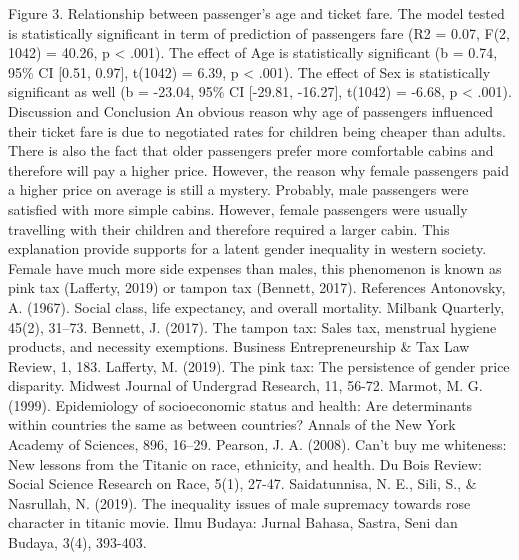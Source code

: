 \documentclass[
]{article}
\begin{document}
Figure 3. Relationship between passenger's age and ticket fare. The
model tested is statistically significant in term of prediction of
passengers fare (R2 = 0.07, F(2, 1042) = 40.26, p \textless{} .001). The
effect of Age is statistically significant (b = 0.74, 95\% CI {[}0.51,
0.97{]}, t(1042) = 6.39, p \textless{} .001). The effect of Sex is
statistically significant as well (b = -23.04, 95\% CI {[}-29.81,
-16.27{]}, t(1042) = -6.68, p \textless{} .001). Discussion and
Conclusion An obvious reason why age of passengers influenced their
ticket fare is due to negotiated rates for children being cheaper than
adults. There is also the fact that older passengers prefer more
comfortable cabins and therefore will pay a higher price. However, the
reason why female passengers paid a higher price on average is still a
mystery. Probably, male passengers were satisfied with more simple
cabins. However, female passengers were usually travelling with their
children and therefore required a larger cabin. This explanation provide
supports for a latent gender inequality in western society. Female have
much more side expenses than males, this phenomenon is known as pink tax
(Lafferty, 2019) or tampon tax (Bennett, 2017). References Antonovsky,
A. (1967). Social class, life expectancy, and overall mortality. Milbank
Quarterly, 45(2), 31--73. Bennett, J. (2017). The tampon tax: Sales tax,
menstrual hygiene products, and necessity exemptions. Business
Entrepreneurship \& Tax Law Review, 1, 183. Lafferty, M. (2019). The
pink tax: The persistence of gender price disparity. Midwest Journal of
Undergrad Research, 11, 56-72. Marmot, M. G. (1999). Epidemiology of
socioeconomic status and health: Are determinants within countries the
same as between countries? Annals of the New York Academy of Sciences,
896, 16--29. Pearson, J. A. (2008). Can't buy me whiteness: New lessons
from the Titanic on race, ethnicity, and health. Du Bois Review: Social
Science Research on Race, 5(1), 27-47. Saidatunnisa, N. E., Sili, S., \&
Nasrullah, N. (2019). The inequality issues of male supremacy towards
rose character in titanic movie. Ilmu Budaya: Jurnal Bahasa, Sastra,
Seni dan Budaya, 3(4), 393-403.
\end{document}
